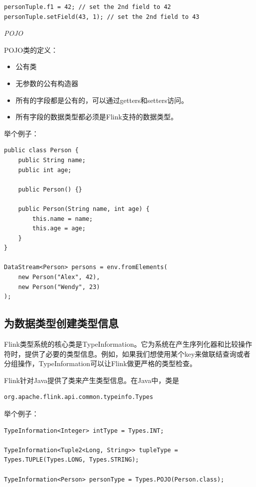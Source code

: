 \documentclass[cn,11pt,chinese]{elegantbook}
\begin{document}
\begin{verbatim}
personTuple.f1 = 42; // set the 2nd field to 42
personTuple.setField(43, 1); // set the 2nd field to 43
\end{verbatim}

\textit{POJO}

POJO类的定义：

\begin{itemize}
    \item 公有类
    \item 无参数的公有构造器
    \item 所有的字段都是公有的，可以通过getters和setters访问。
    \item 所有字段的数据类型都必须是Flink支持的数据类型。
\end{itemize}

举个例子：

\begin{verbatim}
public class Person {
    public String name;
    public int age;

    public Person() {}

    public Person(String name, int age) {
        this.name = name;
        this.age = age;
    }
}

DataStream<Person> persons = env.fromElements(
    new Person("Alex", 42),
    new Person("Wendy", 23)
);
\end{verbatim}

\subsection{为数据类型创建类型信息}

Flink类型系统的核心类是TypeInformation。它为系统在产生序列化器和比较操作符时，提供了必要的类型信息。例如，如果我们想使用某个key来做联结查询或者分组操作，TypeInformation可以让Flink做更严格的类型检查。

Flink针对Java提供了类来产生类型信息。在Java中，类是

\begin{verbatim}
org.apache.flink.api.common.typeinfo.Types
\end{verbatim}

举个例子：

\begin{verbatim}
TypeInformation<Integer> intType = Types.INT;

TypeInformation<Tuple2<Long, String>> tupleType = Types.TUPLE(Types.LONG, Types.STRING);

TypeInformation<Person> personType = Types.POJO(Person.class);
\end{verbatim}
\end{document}
